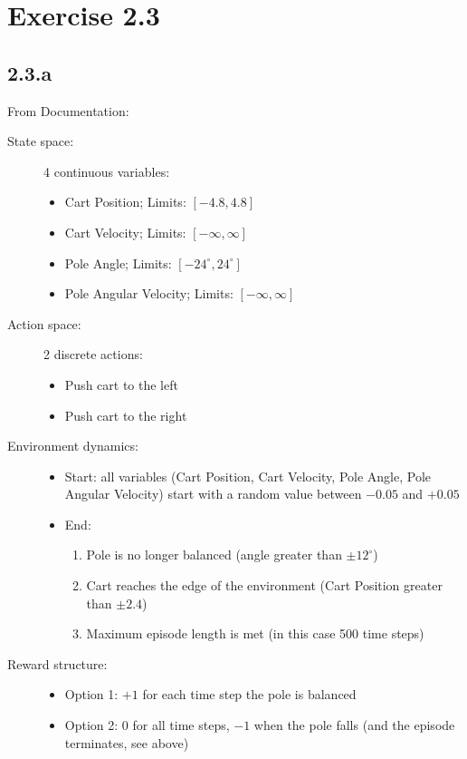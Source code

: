 \documentclass{article} %
\begin{document}
	
	\section{Exercise 2.3}
	\subsection{2.3.a}
	From Documentation: 
	\begin{description}
		\item[State space:] 4 continuous variables:
		\begin{itemize}
			\item Cart Position; Limits: $[-4.8, 4.8]$
			\item Cart Velocity; Limits: $[-\infty, \infty]$
			\item Pole Angle; Limits: $[-24^\circ, 24^\circ]$
			\item Pole Angular Velocity; Limits: $[-\infty, \infty]$
		\end{itemize}
		
		\item[Action space:] 2 discrete actions:
		\begin{itemize}
			\item Push cart to the left
			\item Push cart to the right
		\end{itemize}
		
		\item[Environment dynamics:]
		\begin{itemize}
			\item Start: all variables (Cart Position, Cart Velocity, Pole Angle, Pole Angular Velocity) start with a random value between $-0.05$ and $+0.05$
			\item End:
			\begin{enumerate}
				\item Pole is no longer balanced (angle greater than $\pm12^\circ$)
				\item Cart reaches the edge of the environment (Cart Position greater than $\pm2.4$)
				\item Maximum episode length is met (in this case 500 time steps)
			\end{enumerate}
		\end{itemize}
		
		\item[Reward structure:] 
		\begin{itemize}
			\item Option 1: $+1$ for each time step the pole is balanced
			\item Option 2: $0$ for all time steps, $-1$ when the pole falls (and the episode terminates, see above)
		\end{itemize}
	\end{description}
	
\end{document}
